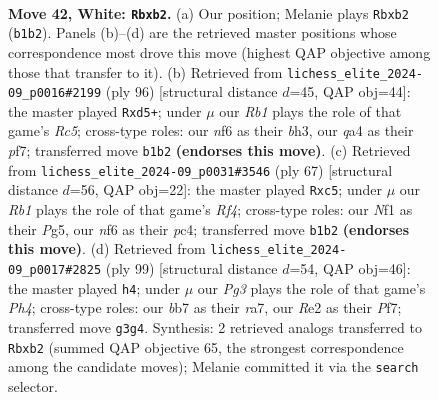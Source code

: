 \documentclass[11pt]{article}
\begin{document}
\clearpage

\begin{figure}[p]\centering
\begin{subfigure}{0.46\textwidth}\centering
\resizebox{\linewidth}{!}{%
\newchessgame
\chessboard[
  setfen={5k2/1b3p2/5np1/7p/q7/6P1/1p2RP1P/1R3NK1 w - - 0 42},
  showmover=false,
  pgfstyle=straightmove, color=movearrow, markmove={b1-b2}
]}
\caption{}
\end{subfigure}\hfill
\begin{subfigure}{0.46\textwidth}\centering
\resizebox{\linewidth}{!}{%
\newchessgame
\chessboard[
  setfen={1r6/5p2/8/1PRp2k1/3P3p/2P1KP1b/4N3/8 w - - 0 49},
  showmover=false,
  pgfstyle=straightmove, color=movearrow, markmove={c5-d5}
]}
\caption{}
\end{subfigure}
\\[4pt]
\begin{subfigure}{0.46\textwidth}\centering
\resizebox{\linewidth}{!}{%
\newchessgame
\chessboard[
  setfen={8/p4pk1/7p/2P2rp1/2PR4/P6P/5PP1/5K2 b - - 2 34},
  showmover=false,
  pgfstyle=straightmove, color=movearrow, markmove={f5-c5}
]}
\caption{}
\end{subfigure}\hfill
\begin{subfigure}{0.46\textwidth}\centering
\resizebox{\linewidth}{!}{%
\newchessgame
\chessboard[
  setfen={8/R4pk1/4pnp1/PB5p/8/7P/5rPK/8 b - - 0 50},
  showmover=false,
  pgfstyle=straightmove, color=movearrow, markmove={h5-h4}
]}
\caption{}
\end{subfigure}
\caption{\textbf{Move 42, White: \texttt{Rbxb2}.} (a) Our position; Melanie plays \texttt{Rbxb2} (\texttt{b1b2}). Panels (b)--(d) are the retrieved master positions whose correspondence most drove this move (highest QAP objective among those that transfer to it). (b) Retrieved from \texttt{lichess\_elite\_2024-09\_p0016\#2199} (ply 96) [structural distance $d$=45, QAP obj=44]: the master played \texttt{Rxd5+}; under $\mu$ our \emph{Rb1} plays the role of that game's \emph{Rc5}; cross-type roles: our \emph{n}f6 as their \emph{b}h3, our \emph{q}a4 as their \emph{p}f7; transferred move \texttt{b1b2} \textbf{(endorses this move)}. (c) Retrieved from \texttt{lichess\_elite\_2024-09\_p0031\#3546} (ply 67) [structural distance $d$=56, QAP obj=22]: the master played \texttt{Rxc5}; under $\mu$ our \emph{Rb1} plays the role of that game's \emph{Rf4}; cross-type roles: our \emph{N}f1 as their \emph{P}g5, our \emph{n}f6 as their \emph{p}c4; transferred move \texttt{b1b2} \textbf{(endorses this move)}. (d) Retrieved from \texttt{lichess\_elite\_2024-09\_p0017\#2825} (ply 99) [structural distance $d$=54, QAP obj=46]: the master played \texttt{h4}; under $\mu$ our \emph{Pg3} plays the role of that game's \emph{Ph4}; cross-type roles: our \emph{b}b7 as their \emph{r}a7, our \emph{R}e2 as their \emph{P}f7; transferred move \texttt{g3g4}. Synthesis: 2 retrieved analogs transferred to \texttt{Rbxb2} (summed QAP objective 65, the strongest correspondence among the candidate moves); Melanie committed it via the \texttt{search} selector.}
\label{fig:thought-m82}
\end{figure}
\end{document}
